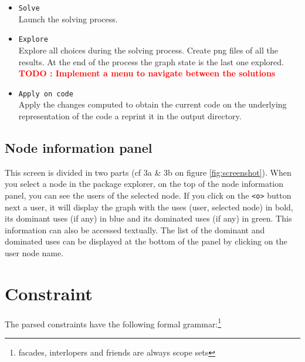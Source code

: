 \documentclass[]{article}
\newcommand{\todo}[1]{\textcolor{red}{\textbf{TODO : #1}}}
\begin{document}
\begin{itemize}
	\item \verb|Solve|\\
	Launch the solving process.
	
	\item \verb|Explore|\\
	Explore all choices during the solving process. Create png files of all the results. At the end of the process the graph state is the last one explored.
	\todo{Implement a menu to navigate between the solutions}
	
	\item \verb|Apply on code|\\
	Apply the changes computed to obtain the current code on the underlying representation of the code a reprint it in the output directory.
	
\end{itemize}

\subsection{Node information panel}
This screen is divided in two parts (cf 3a \& 3b on figure \ref{fig:screenshot}).
When you select a node in the package explorer, on the top of the node information panel, you can see the users of the selected node. If you click on the \verb|<o>| button next a user, it will display the graph with the uses (user, selected node) in bold, its dominant uses (if any) in blue and its dominated uses (if any) in green.
This information can also be accessed textually. The list of the dominant and dominated uses can be displayed at the bottom of the panel by clicking on the user node name.

\section{Constraint}
The parsed constraints have the following formal grammar:\footnote{facades, interlopers and friends are always scope sets}
\end{document}
